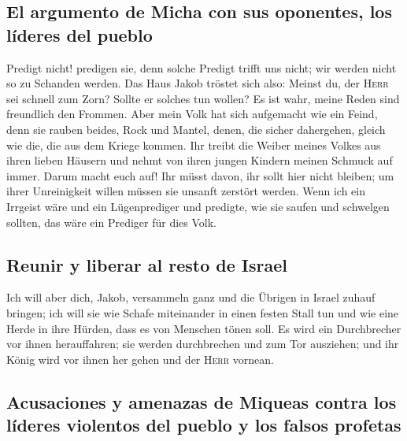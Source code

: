 \hypertarget{el-argumento-de-micha-con-sus-oponentes-los-luxedderes-del-pueblo}{%
\subsection{El argumento de Micha con sus oponentes, los líderes del
pueblo}\label{el-argumento-de-micha-con-sus-oponentes-los-luxedderes-del-pueblo}}

 Predigt nicht! predigen sie, denn solche Predigt trifft
uns nicht; wir werden nicht so zu Schanden werden.  Das
Haus Jakob tröstet sich also: Meinst du, der \textsc{Herr} sei schnell
zum Zorn? Sollte er solches tun wollen? Es ist wahr, meine Reden sind
freundlich den Frommen.  Aber mein Volk hat sich
aufgemacht wie ein Feind, denn sie rauben beides, Rock und Mantel,
denen, die sicher dahergehen, gleich wie die, die aus dem Kriege kommen.
 Ihr treibt die Weiber meines Volkes aus ihren lieben
Häusern und nehmt von ihren jungen Kindern meinen Schmuck auf immer.
 Darum macht euch auf! Ihr müsst davon, ihr sollt hier
nicht bleiben; um ihrer Unreinigkeit willen müssen sie unsanft zerstört
werden.  Wenn ich ein Irrgeist wäre und ein Lügenprediger
und predigte, wie sie saufen und schwelgen sollten, das wäre ein
Prediger für dies Volk.

\hypertarget{reunir-y-liberar-al-resto-de-israel}{%
\subsection{Reunir y liberar al resto de
Israel}\label{reunir-y-liberar-al-resto-de-israel}}

 Ich will aber dich, Jakob, versammeln ganz und die
Übrigen in Israel zuhauf bringen; ich will sie wie Schafe miteinander in
einen festen Stall tun und wie eine Herde in ihre Hürden, dass es von
Menschen tönen soll.  Es wird ein Durchbrecher vor ihnen
herauffahren; sie werden durchbrechen und zum Tor ausziehen; und ihr
König wird vor ihnen her gehen und der \textsc{Herr} vornean.

\hypertarget{acusaciones-y-amenazas-de-miqueas-contra-los-luxedderes-violentos-del-pueblo-y-los-falsos-profetas}{%
\subsection{Acusaciones y amenazas de Miqueas contra los líderes
violentos del pueblo y los falsos
profetas}\label{acusaciones-y-amenazas-de-miqueas-contra-los-luxedderes-violentos-del-pueblo-y-los-falsos-profetas}}

